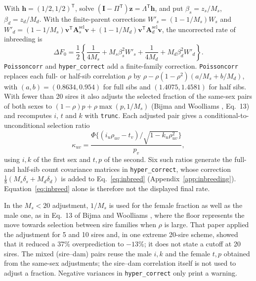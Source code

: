 \documentclass[11pt]{article}
\newcommand{\src}[1]{\texttt{#1}}
\newcommand{\ve}[1]{\boldsymbol{#1}}
\newcommand{\ma}[1]{\mathbf{#1}}
\begin{document}
With $\ve h=(1/2,1/2)^{\mathsf T}$, solve $(\ma I-\Pi^{\mathsf T})\ve z=\Lambda^{\mathsf T}\ve h$, and put $\beta_s=z_s/M_s$, $\beta_d=z_d/M_d$. With the finite-parent corrections $W'_s=(1-1/M_s)W_s$ and $W'_d=(1-1/M_s)\ve v^{\mathsf T}\ma A_s^{\mathrm{sel}}\ve v+(1-1/M_d)\ve v^{\mathsf T}\ma A_d^{\mathrm{sel}}\ve v$, the uncorrected rate of inbreeding is
\begin{equation}\label{eq:inbreed}
\Delta F_0=\frac12\left\{\frac1{4M_s}+M_s\beta_s^2W'_s+
\frac1{4M_d}+M_d\beta_d^2W'_d\right\}.
\end{equation}
\src{Poissoncorr} and \src{hyper\_correct} add a finite-family correction. \src{Poissoncorr} replaces each full- or half-sib correlation $\rho$ by $\rho-\rho(1-\rho^2)(a/M_s+b/M_d)$, with $(a,b)=(0.8634,0.954)$ for full sibs and $(1.4075,1.4581)$ for half sibs. With fewer than 20 sires it also adjusts the selected fraction of the same-sex pairs of both sexes to $(1-\rho)p+\rho\max(p,1/M_s)$ (Bijma and Woolliams \cite{bijmawoolliams2000}, Eq.~13) and recomputes $i$, $t$ and $k$ with \src{trunc}. Each adjusted pair gives a conditional-to-unconditional selection ratio
\begin{equation}\label{eq:poissonratio}
\kappa_{uv}=\frac{\Phi\{(i_u\rho_{uv}-t_v)/\sqrt{1-k_u\rho_{uv}^2}\}}{p_v},
\end{equation}
using $i,k$ of the first sex and $t,p$ of the second. Six such ratios generate the full- and half-sib count covariance matrices in \src{hyper\_correct}, whose correction $\tfrac18(M_s\delta_s+M_d\delta_d)$ is added to Eq.~\eqref{eq:inbreed} (Appendix~\ref{app:inbreeding}). Equation~\eqref{eq:inbreed} alone is therefore not the displayed final rate.

\begin{codenote}
In the $M_s<20$ adjustment, $1/M_s$ is used for the female fraction as well as the male one, as in Eq.~13 of Bijma and Woolliams \cite{bijmawoolliams2000}, where the floor represents the move towards selection between sire families when $\rho$ is large. That paper applied the adjustment for 5 and 10 sires and, in one extreme 20-sire scheme, showed that it reduced a 37\% overprediction to $-13$\%; it does not state a cutoff at 20 sires. The mixed (sire--dam) pairs reuse the male $i,k$ and the female $t,p$ obtained from the same-sex adjustments; the sire--dam correlation itself is not used to adjust a fraction. Negative variances in \src{hyper\_correct} only print a warning.
\end{codenote}

\end{document}
